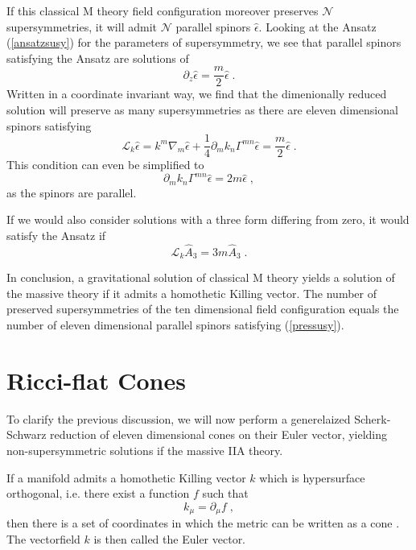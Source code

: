 \documentclass[a4paper,12pt]{article}
\newcommand{\ft}[2]{{\textstyle\frac{#1}{#2}}}
\begin{document}
If this classical M theory field configuration moreover preserves $\mathcal{N}$ supersymmetries, it will admit $\mathcal{N}$ parallel spinors $\hat{\epsilon}$. Looking at the Ansatz (\ref{ansatzsusy}) for the parameters of supersymmetry, we see that parallel spinors satisfying the Ansatz are solutions of
\begin{equation}
\partial_z \hat{\epsilon}=\ft m2 \hat{\epsilon}\; .
\end{equation}
Written in a coordinate invariant way, we find that the dimenionally reduced solution will preserve as many supersymmetries as there are eleven dimensional spinors satisfying
\begin{equation}
\mathcal{L}_k \hat{\epsilon}=k^m \nabla_m \hat{\epsilon}+\ft14 \partial_m k_n \Gamma^{mn} \hat{\epsilon}=\ft m2 \hat{\epsilon} \; .
\end{equation}
This condition can even be simplified to
\begin{equation}\label{pressusy}
\partial_m k_n \Gamma^{mn} \hat{\epsilon}=2m \hat{\epsilon}\; ,
\end{equation} 
as the spinors are parallel.

If we would also consider solutions with a three form differing from zero, it would satisfy the Ansatz if
\begin{equation}
\mathcal{L}_{k} \hat{A}_3=3m\hat{A}_3 \; .
\end{equation}

In conclusion, a gravitational solution of classical M theory yields a solution of the massive theory if it admits a homothetic Killing vector. The number of preserved supersymmetries of the ten dimensional field configuration equals the number of eleven dimensional parallel spinors satisfying (\ref{pressusy}).
\section{Ricci-flat Cones}\label{ricciflat}
To clarify the previous discussion, we will now perform a generelaized Scherk-Schwarz reduction of eleven dimensional cones on their Euler vector, yielding non-supersymmetric solutions if the massive IIA theory.

If a manifold admits a homothetic Killing vector $k$ which is hypersurface orthogonal, i.e. there exist a function $f$ such that
\begin{equation}
k_\mu=\partial_\mu f \; ,
\end{equation}
then there is a set of coordinates in which the metric can be written as a cone \cite{Gibbons:1998xa}. The vectorfield $k$ is then called the Euler vector. 
\end{document}
